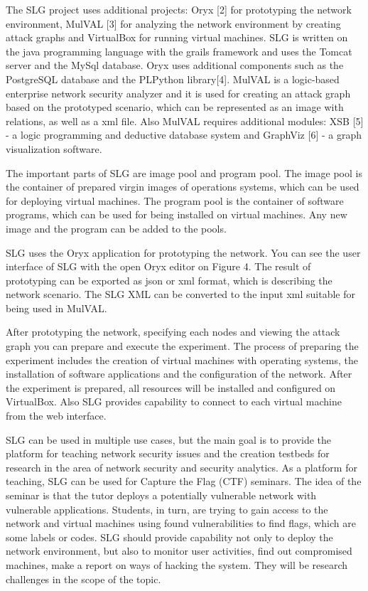 The SLG project uses additional projects: Oryx [2] for prototyping the network environment, MulVAL [3] for analyzing the network environment by creating attack graphs and VirtualBox for running virtual machines. SLG is written on the java programming language with the grails framework and uses the Tomcat server and the MySql database. Oryx uses additional components such as the PostgreSQL database and the PLPython library[4]. MulVAL is a logic-based enterprise network security analyzer and it is used for creating an attack graph based on the prototyped scenario, which can be represented as an image with relations, as well as a xml file. Also MulVAL requires additional modules: XSB [5] - a logic programming and deductive database system and GraphViz [6] - a graph visualization software. 

The important parts of SLG are image pool and program pool. The image pool is the container of prepared virgin images of operations systems, which can be used for deploying virtual machines. The program pool is the container of software programs, which can be used for being installed on virtual machines. Any new image and the program can be added to the pools.

SLG uses the Oryx application for prototyping the network. You can see the user interface of SLG with the open Oryx editor on Figure 4. The result of prototyping can be exported as json or xml format, which is describing the network scenario. The SLG XML can be converted to the input xml suitable for being used in MulVAL. 

After prototyping the network, specifying each nodes and viewing the attack graph you can prepare and execute the experiment. The process of preparing the experiment includes the creation of virtual machines with operating systems, the installation of software applications and the configuration of the network. After the experiment is prepared, all resources will be installed and configured on VirtualBox. Also SLG provides capability to connect to each virtual machine from the web interface. 


SLG can be used in multiple use cases, but the main goal is to provide the platform for teaching network security issues and the creation testbeds for research in the area of network security and security analytics. 
As a platform for teaching, SLG can be used for Capture the Flag (CTF) seminars. The idea of the seminar is that the tutor deploys a potentially vulnerable network with vulnerable applications. Students, in turn, are trying to gain access to the network and virtual machines using found vulnerabilities to find flags, which are some labels or codes. SLG should provide capability not only to deploy the network environment, but also to monitor user activities, find out compromised machines, make a report on ways of hacking the system. They will be research challenges in the scope of the topic.
  
